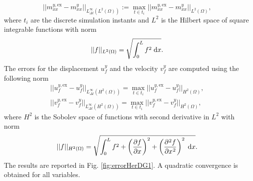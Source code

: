 \documentclass{svjour3}                     %
\begin{document}
{\begin{equation*}
		||m_{xx}^{y, \text{ex}} -  m_{xx}^{y}||_{L^\infty_{\Delta t} (L^2(\Omega))} := \max_{t \in t_i} ||m_{xx}^{y, \text{ex}} -  m_{xx}^{y}||_{L^2(\Omega)}, 
		\end{equation*}
		where $t_i$ are the discrete simulation instants and $L^2$ is the Hilbert space of square integrable functions with norm
		\begin{equation*}
		||f||_{L^2(\Omega)} = \sqrt{\int_{0}^{L} f^2\d{x}}.
		\end{equation*}
		The errors for the displacement $u_f^{y}$ and the velocity $v_f^{y}$ are computed using the following norm
		\begin{equation*}
		\begin{aligned}
		||u_f^{y, \text{ex}} -  u_f^{y}||_{L^\infty_{\Delta t} (H^2(\Omega))} = \max_{t \in t_i} ||u_f^{y, \text{ex}} -  u_f^{y}||_{H^2(\Omega)}, \\
		||v_f^{y, \text{ex}} -  v_f^{y}||_{L^\infty_{\Delta t} (H^2(\Omega))} = \max_{t \in t_i} ||v_f^{y, \text{ex}} -  v_f^{y}||_{H^2(\Omega)}, 
		\end{aligned}	
		\end{equation*}
		where $H^2$ is the Sobolev space of functions with second derivative in $L^2$ with norm
		\begin{equation*}
		||f||_{H^2(\Omega)} = \sqrt{\int_{0}^{L} f^2 + \left(\diffp{f}{x}\right)^2 + \left(\diffp[2]{f}{x}\right)^2 \d{x}}.
		\end{equation*}
		The results are reported in Fig. \ref{fig:errorHerDG1}. A quadratic convergence is obtained for all variables.
		\begin{figure}[tbh]%
			\centering
			\hspace{8pt}%

\end{figure}}
\end{document}
